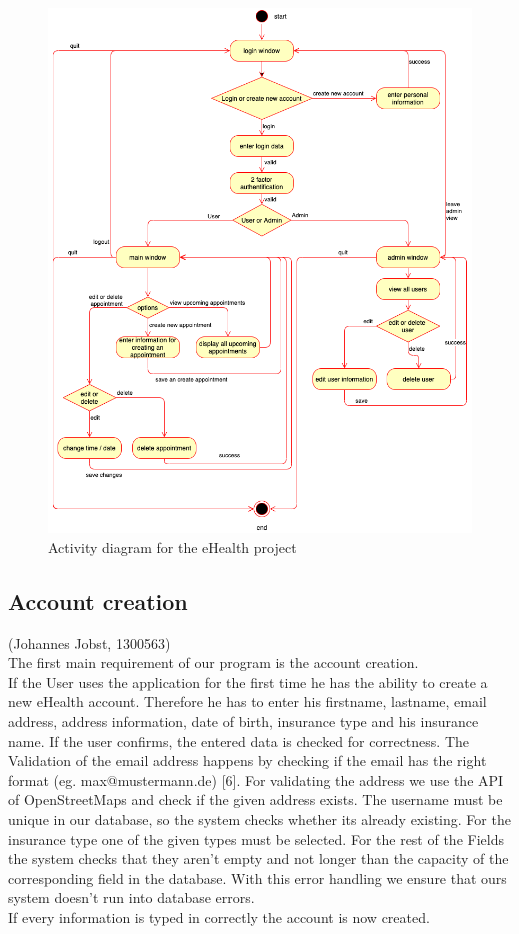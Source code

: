 \documentclass[a4paper, 12pt]{report}
\begin{document}
\begin{figure}[!h]
	\includegraphics[width=\linewidth]{eHealth_Activity.png}
	\caption{Activity diagram for the eHealth project}
\end{figure}

\subsection{Account creation}
{\tiny (Johannes Jobst, 1300563)\\}
The first main requirement of our program is the account creation.\\
If the User uses the application for the first time he has the ability to create a new eHealth account. Therefore he has to enter his firstname, lastname, email address, address information, date of birth, insurance type and his insurance name.
If the user confirms, the entered data is checked for correctness.
The Validation of the email address happens by checking if the email has the right format (eg. max@mustermann.de) [6]. For validating the address we use the API of OpenStreetMaps and check if the given address exists.
The username must be unique in our database, so the system checks whether its already existing. For the insurance type one of the given types must be selected.
For the rest of the Fields the system checks that they aren't empty and not longer than the capacity of the corresponding field in the database.
With this error handling we ensure that ours system doesn't run into database errors.\\
If every information is typed in correctly the account is now created.
\end{document}
